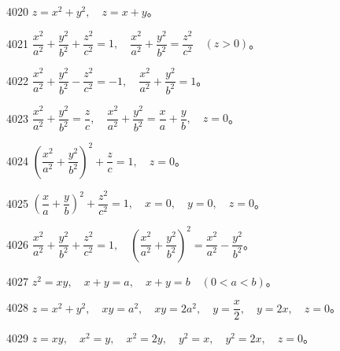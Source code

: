 \begin{prob}[S]{4020}
$z = x^2 + y^2, \quad z = x + y$。
\end{prob}


\begin{prob}[S]{4021}
$\dfrac{x^2}{a^2} + \dfrac{y^2}{b^2} + \dfrac{z^2}{c^2} = 1, \quad \dfrac{x^2}{a^2} + \dfrac{y^2}{b^2} = \dfrac{z^2}{c^2} \quad (z > 0)$。
\end{prob}

\begin{prob}[S]{4022}
$\dfrac{x^2}{a^2} + \dfrac{y^2}{b^2} - \dfrac{z^2}{c^2} = -1, \quad \dfrac{x^2}{a^2} + \dfrac{y^2}{b^2} = 1$。
\end{prob}

\begin{prob}[S]{4023}
$\dfrac{x^2}{a^2} + \dfrac{y^2}{b^2} = \dfrac{z}{c}, \quad \dfrac{x^2}{a^2} + \dfrac{y^2}{b^2} = \dfrac{x}{a} + \dfrac{y}{b}, \quad z = 0$。
\end{prob}

\begin{prob}[S]{4024}
$\left(\dfrac{x^2}{a^2} + \dfrac{y^2}{b^2}\right)^2 + \dfrac{z}{c} = 1, \quad z = 0$。
\end{prob}

\begin{prob}[S]{4025}
$\left(\dfrac{x}{a} + \dfrac{y}{b}\right)^2 + \dfrac{z^2}{c^2} = 1, \quad x = 0, \quad y = 0, \quad z = 0$。
\end{prob}

\begin{prob}[S]{4026}
$\dfrac{x^2}{a^2} + \dfrac{y^2}{b^2} + \dfrac{z^2}{c^2} = 1, \quad \left(\dfrac{x^2}{a^2} + \dfrac{y^2}{b^2}\right)^2 = \dfrac{x^2}{a^2} - \dfrac{y^2}{b^2}$。
\end{prob}

\begin{prob}[S]{4027}
$z^2 = xy, \quad x + y = a, \quad x + y = b \quad (0 < a < b)$。
\end{prob}

\begin{prob}[S]{4028}
$z = x^2 + y^2, \quad xy = a^2, \quad xy = 2a^2, \quad y = \dfrac{x}{2}, \quad y = 2x, \quad z = 0$。
\end{prob}

\begin{prob}[S]{4029}
$z = xy, \quad x^2 = y, \quad x^2 = 2y, \quad y^2 = x, \quad y^2 = 2x, \quad z = 0$。
\end{prob}

